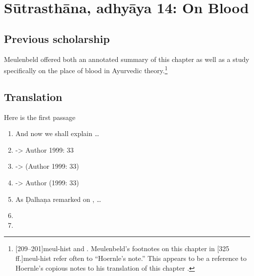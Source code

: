 
\section{Sūtrasthāna, adhyāya 14:  On Blood}


\subsection{Previous scholarship}

Meulenbeld offered both an annotated summary of this chapter as well as a
 study specifically on the place of blood
in Ayurvedic theory.\footnote{[209--201]{meul-hist}  and  \cite{meul-1991}.  Meulenbeld's footnotes on this chapter in [325\,ff.]{meul-hist} refer often to ``Hoernle's note.''  This appears to be a reference to Hoernle's copious notes to his translation of this chapter \citep[87--98]{hoer-1897}.}







\subsection{Translation}

\begin{translation}    
\item [1] Here is the first passage

   \begin{enumerate}
  
       \item 
    And now we shall explain \ldots {}

\item 

    \cite[33]{adri-1984} -> Author 1999: 33
\item     
    \citep[33]{adri-1984} -> (Author 1999: 33)
\item     
    \citet[33]{adri-1984} -> Author (1999: 33) 
\item 
    As Ḍalhaṇa remarked on , \ldots  %
\item \SS
\item \CS
   \end{enumerate}
    

\end{translation}

